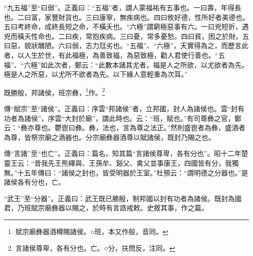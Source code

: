 {\noindent\shu{}\fzkt “九五福”至“曰弱”。正義曰：“五福”者，謂人蒙福祐有五事也。一曰壽，年得長也。二曰富，家豐財貨也。三曰康寧，無疾病也。四曰攸好德，性所好者美德也。五曰考終命，成終長短之命，不橫夭也。“六極”謂窮極惡事有六。一曰兇短折，遇兇而橫夭性命也。二曰疾，常抱疾病。三曰憂，常多憂愁。四曰貧，困之於財。五曰惡，貌狀醜陋。六曰弱，志力尫劣也。“五福”、“六極”，天實得為之，而歷言此者，以人生於世，有此福極，為善致福，為惡致極，勸人君使行善也。“五福”、“六極”如此次者，鄭云：“此數本諸其尤者，福是人之所欲，以尤欲者為先。極是人之所惡，以尤所不欲者為先。以下緣人意輕重為次耳。” \par}

既勝殷，邦諸侯，班宗彝，\footnote{賦宗廟彝器酒樽賜諸侯。○班，本又作般，音同。}作。\footnote{言諸侯尊卑，各有分也。亡。○分，扶問反，注同。}

{\noindent\zhuan{}\fzbyks 傳“賦宗”至“諸侯”。正義曰：序雲“邦諸侯”者，立邦國，封人為諸侯也。雲“封有功者為諸侯”，序雲“大封於廟”，謂此時也。云：“班，賦也。”有司尊彝之官，鄭云：“彝亦尊也。鬱鬯曰彝。彝，法也，言為尊之法正。”然則盛鬯者為彝，盛酒者為尊，皆祭宗廟之酒器也。分宗廟彝器酒尊以賦諸侯，既封乃賜之也。 \par}

{\noindent\zhuan{}\fzbyks 傳“言諸”至“也亡”。正義曰：篇名，知其篇“言諸侯尊卑，各有分也”。昭十二年楚靈王云：“昔我先王熊繹與、王孫牟、谿父、禽父並事康王，四國皆有分，我獨無。”十五年傳曰：“諸侯之封也，皆受明器於王室。”杜預云：“謂明德之分器也。”是諸侯各有分也，亡。 \par}

{\noindent\shu{}\fzkt “武王”至“分器”。正義曰：武王既已勝殷，制邦國以封有功者為諸侯。既封為國君，乃班賦宗廟彝器以賜之，於時有言誥戒敕。史敘其事，作之篇。 \par}

